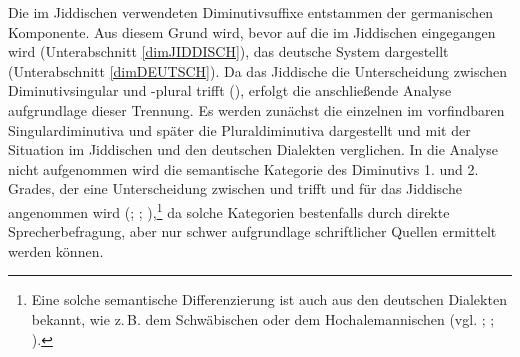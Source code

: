 Die im Jiddischen verwendeten Diminutivsuffixe entstammen der germanischen Komponente. Aus diesem Grund wird, bevor auf die  im Jiddischen eingegangen wird (Unterabschnitt \ref{dimJIDDISCH}), das deutsche System dargestellt (Unterabschnitt \ref{dimDEUTSCH}). Da das Jiddische die Unterscheidung zwischen Diminutivsingular und -plural trifft (\cite[162–166]{Jacobs2005}), erfolgt die anschließende Analyse aufgrundlage dieser Trennung. Es werden zunächst die einzelnen im  vorfindbaren Singulardiminutiva  und später die Pluraldiminutiva dargestellt und mit der Situation im Jiddischen und den deutschen Dialekten verglichen. In die Analyse nicht aufgenommen wird die semantische Kategorie des Diminutivs 1. und 2. Grades, der eine Unterscheidung zwischen  und  trifft und für das Jiddische angenommen wird (\cite[48]{Landau1895}; \cite[80]{Perlmutter1988}; \cite[162]{Jacobs2005}),\footnote{Eine solche semantische Differenzierung ist auch aus den deutschen Dialekten bekannt, wie z.\,B. dem Schwäbischen oder dem Hochalemannischen (vgl. \cite[1250]{Seebold1983}; \cite[159–208]{Luessy1974}; \cite[162]{Schirmunski1962}).} da solche Kategorien bestenfalls durch direkte Sprecherbefragung, aber nur schwer aufgrundlage schriftlicher Quellen ermittelt werden können.\\





